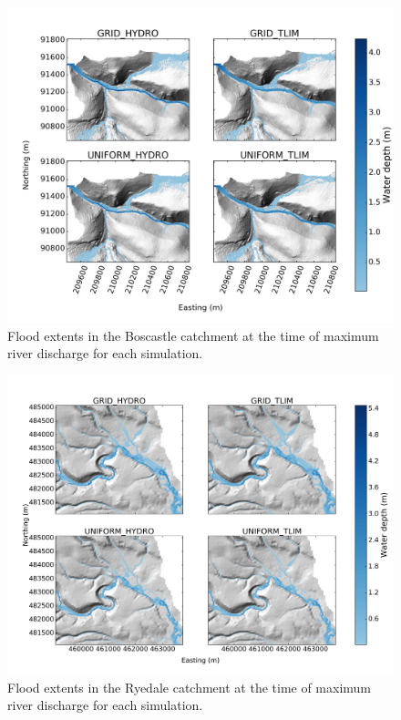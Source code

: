 \begin{figure}
\includegraphics[width=20cm]{chp06_figures_scripts/figure_boscastle_peak_flood_ensemble.png}
\caption{Flood extents in the Boscastle catchment at the time of maximum river discharge for each simulation.}
\label{fig_boscastle_2dplan_flood_ensemble}
\end{figure}

\begin{figure}
\includegraphics[width=20cm]{chp06_figures_scripts/figure_ryedale_peak_flood_ensemble.png}
\caption{Flood extents in the Ryedale catchment at the time of maximum river discharge for each simulation.}
\label{fig_ryedale_2dplan_flood_ensemble}
\end{figure}

